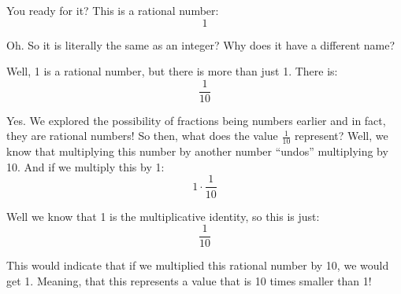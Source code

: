 \documentclass{article}
\begin{document}





You ready for it? This is a rational number: 
\[ 1 \]

Oh. So it is literally the same as an integer? Why does it have a different name? 

Well, 1 is a rational number, but there is more than just 1. There is: 
\[ \frac{1}{10} \]

Yes. We explored the possibility of fractions being numbers earlier and in fact, they are rational numbers!
So then, what does the value $\frac{1}{10}$ represent? Well, we know that multiplying this number by another number ``undos'' multiplying by 10. And if we multiply this by 1: 
\[ 1 \cdot \frac{1}{10} \]

Well we know that 1 is the multiplicative identity, so this is just: 
\[ \frac{1}{10} \]

This would indicate that if we multiplied this rational number by 10, we would get 1. Meaning, that this represents a value that is 10 times smaller than 1! 
\end{document}
